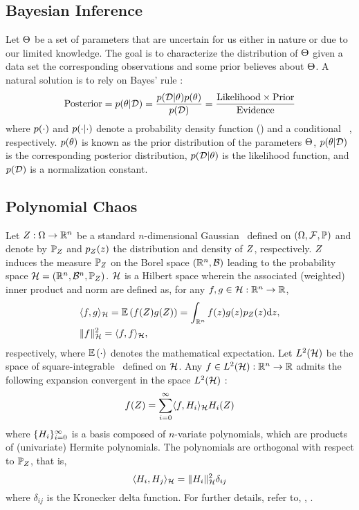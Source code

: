 \subsection{Bayesian Inference}
Let $\U$ be a set of parameters that are uncertain for us either in nature or due to our limited knowledge. The goal is to characterize the distribution of $\U$ given a data set the corresponding observations and some prior believes about $\U$. A natural solution is to rely on Bayes' rule \cite{gelman2004}:
\begin{equation} \elabel{bayes}
  \text{Posterior} = \f{\u | \data} = \frac{\f{\data | \u} \f{\u}}{\f{\data}} = \frac{\text{Likelihood} \times \text{Prior}}{\text{Evidence}}
\end{equation}
where $\f{\cdot}$ and $\f{\cdot | \cdot}$ denote a probability density function (\pdf) and a conditional \pdf\ \cite{durrett2010}, respectively. $\f{\u}$ is known as the prior distribution of the parameters $\U$, $\f{\u | \data}$ is the corresponding posterior distribution, $\f{\data | \u}$ is the likelihood function, and $\f{\data}$ is a normalization constant.

\subsection{Polynomial Chaos}
Let $\vZ: \outcomes \to \real^n$ be a standard $n$-dimensional Gaussian \rv\ defined on $\probabilitySpace$ and denote by $\gaussianProbabilityMeasure$ and $\f{\vZ}{\vz}$ the distribution and density of $\vZ$, respectively. $\vZ$ induces the measure $\gaussianProbabilityMeasure$ on the Borel space $\borelSpace[n]$ leading to the probability space $\hilbertSpace = \gaussianProbabilitySpace[n]$. $\hilbertSpace$ is a Hilbert space wherein the associated (weighted) inner product and norm are defined as, for any $f, g \in \hilbertSpace: \real^n \to \real$,
\begin{align}
  & \iprod{f, g}_\hilbertSpace = \E{f(\vZ) g(\vZ)} = \int_{\real^n} f(\vz) g(\vz) \f{\vZ}{\vz} \d\vz, \elabel{inner-product} \\
  & \norm{f}_\hilbertSpace^2 = \iprod{f, f}_\hilbertSpace \nonumber,
\end{align}
respectively, where $\E{\cdot}$ denotes the mathematical expectation. Let $\L{2}(\hilbertSpace)$ be the space of square-integrable \rvs\ defined on $\hilbertSpace$. Any $f \in \L{2}(\hilbertSpace): \real^n \to \real$ admits the following expansion convergent in the space $\L{2}(\hilbertSpace)$ \cite{maitre2010}:
\[
  f(\vZ) = \sum_{i = 0}^\infty \iprod{f, \pcb_i}_\hilbertSpace \pcb_i(\vZ)
\]
where $\{ \pcb_i \}_{i = 0}^\infty$ is a basis composed of $n$-variate polynomials, which are products of (univariate) Hermite polynomials. The polynomials are orthogonal with respect to $\gaussianProbabilityMeasure$, that is,
\[
  \iprod{\pcb_i, \pcb_j}_\hilbertSpace = \norm{\pcb_i}_\hilbertSpace^2 \delta_{ij}
\]
where $\delta_{ij}$ is the Kronecker delta function. For further details, refer to, \eg, \cite{maitre2010}.

